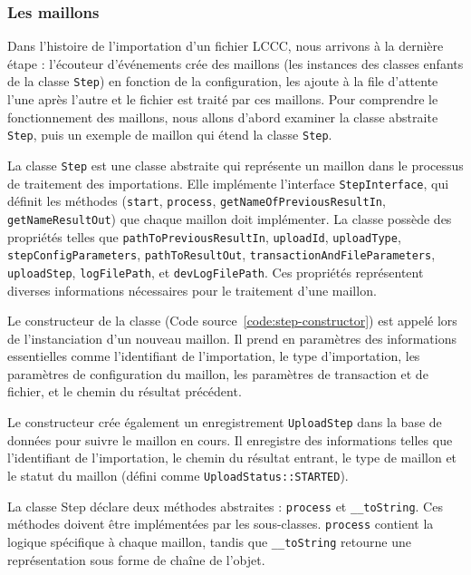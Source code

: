 \subsubsection{Les maillons}

Dans l'histoire de l'importation d'un fichier LCCC, nous arrivons à la dernière étape : l'écouteur d'événements crée des maillons (les instances des classes enfants de la classe \Verb|Step|) en fonction de la configuration, les ajoute à la file d'attente l'une après l'autre et le fichier est traité par ces maillons. Pour comprendre le fonctionnement des maillons, nous allons d'abord examiner la classe abstraite \Verb|Step|, puis un exemple de maillon qui étend la classe \Verb|Step|.

La classe \Verb|Step| est une classe abstraite qui représente un maillon dans le processus de traitement des importations. Elle implémente l'interface \Verb|StepInterface|, qui définit les méthodes (\verb|start|, \Verb|process|, \Verb|getNameOfPreviousResultIn|, \Verb|getNameResultOut|) que chaque maillon doit implémenter. La classe possède des propriétés telles que \Verb|pathToPreviousResultIn|, \Verb|uploadId|, \Verb|uploadType|, \Verb|stepConfigParameters|, \Verb|pathToResultOut|, \Verb|transactionAndFileParameters|, \Verb|uploadStep|, \Verb|logFilePath|, et \Verb|devLogFilePath|. Ces propriétés représentent diverses informations nécessaires pour le traitement d'une maillon.

Le constructeur de la classe (Code source~\ref{code:step-constructor}) est appelé lors de l'instanciation d'un nouveau maillon. Il prend en paramètres des informations essentielles comme l'identifiant de l'importation, le type d'importation, les paramètres de configuration du maillon, les paramètres de transaction et de fichier, et le chemin du résultat précédent.


Le constructeur crée également un enregistrement \Verb|UploadStep| dans la base de données pour suivre le maillon en cours. Il enregistre des informations telles que l'identifiant de l'importation, le chemin du résultat entrant, le type de maillon et le statut du maillon (défini comme \Verb|UploadStatus::STARTED|).

La classe Step déclare deux méthodes abstraites : \Verb|process| et \Verb|__toString|. Ces méthodes doivent être implémentées par les sous-classes. \Verb|process| contient la logique spécifique à chaque maillon, tandis que \Verb|__toString| retourne une représentation sous forme de chaîne de l'objet.

